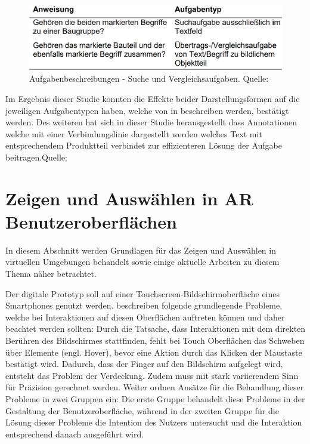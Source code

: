 \begin{figure}[H]
	\centering 
	\includegraphics[width=.6\textwidth]{resources/analyse/brandenburg_aufgabentypen.png}
	\caption{Aufgabenbeschreibungen - Suche und Vergleichsaufgaben. Quelle: \cite[S.~132]{Brandenburg2019}}
	\label{img:aufgabenbeschreibung}
\end{figure}

Im Ergebnis dieser Studie konnten die Effekte beider Darstellungsformen auf die jeweiligen Aufgabentypen haben, welche von \citeauthor{Polys2007} in \cite{Polys2007} beschreiben werden, bestätigt werden.
Des weiteren hat sich in dieser Studie herausgestellt dass Annotationen welche mit einer Verbindungslinie dargestellt werden welches Text mit entsprechendem Produktteil verbindet 
zur effizienteren Lösung der Aufgabe beitragen.Quelle: \cite[S.~135]{Brandenburg2019}

\section{Zeigen und Auswählen in AR Benutzeroberflächen} \label{pointer_section}

In diesem Abschnitt werden Grundlagen für das Zeigen und Auswählen in virtuellen Umgebungen behandelt sowie einige aktuelle Arbeiten 
zu diesem Thema näher betrachtet. 

Der digitale Prototyp soll auf einer Touchscreen-Bildschirmoberfläche eines Smartphones genutzt werden.
\citeauthor{Ortega2016} beschreiben folgende grundlegende Probleme, welche bei Interaktionen auf diesen Oberflächen auftreten können und daher beachtet werden sollten:  
Durch die Tatsache, dass Interaktionen mit dem direkten Berühren des Bildschirmes stattfinden, fehlt bei Touch Oberflächen das Schweben über Elemente (engl. Hover), bevor eine Aktion durch das Klicken der Maustaste bestätigt wird. 
Dadurch, dass der Finger auf den Bildschirm aufgelegt wird, entsteht das Problem der Verdeckung. Zudem muss mit stark variierendem Sinn für Präzision gerechnet werden. Weiter ordnen \citeauthor{Ortega2016} Ansätze 
für die Behandlung dieser Probleme in zwei Gruppen ein: Die erste Gruppe behandelt diese Probleme in der Gestaltung der Benutzeroberfläche, während in der zweiten Gruppe für die Lösung dieser Probleme die Intention
des Nutzers untersucht und die Interaktion entsprechend danach ausgeführt wird. \cite[S.~205]{Ortega2016}

